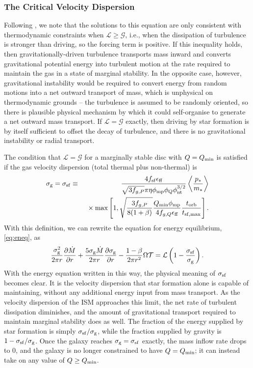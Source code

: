 \documentclass[useAMS,usenatbib]{mn2e}
\newcommand{\calL}{\mathcal{L}}
\newcommand{\calG}{\mathcal{G}}
\newcommand{\calT}{\mathcal{T}}
\newcommand{\phint}{\phi_{\mathrm{nt}}}
\newcommand{\phimp}{\phi_{\mathrm{mp}}}
\newcommand{\Qmin}{Q_{\rm min}}
\begin{document}
\subsubsection{The Critical Velocity Dispersion}

Following \citet{forbes14a}, we note that the solutions to this equation are only consistent with thermodynamic constraints when $\calL \geq \calG$, i.e., when the dissipation of turbulence is stronger than driving, so the forcing term is positive. If this inequality holds, then gravitationally-driven turbulence transports mass inward and converts gravitational potential energy into turbulent motion at the rate required to maintain the gas in a state of marginal stability. In the opposite case, however, gravitational instability would be required to convert energy from random motions into a net outward transport of mass, which is unphysical on thermodynamic grounds -- the turbulence is assumed to be randomly oriented, so there is plausible physical mechanism by which it could self-organise to generate a net outward mass transport. If $\calL = \calG$ exactly, then driving by star formation is by itself sufficient to offset the decay of turbulence, and there is no gravitational instability or radial transport.

The condition that $\calL = \calG$ for a marginally stable disc with $Q = \Qmin$ is satisfied if the gas velocity dispersion (total thermal plus non-thermal) is
\begin{eqnarray}
\label{eq:sigma_sf}
\sigma_{\rm g} = \sigma_{\rm sf} & \equiv &
\frac{4f_{\rm sf} \epsilon_{\rm ff}}{\sqrt{3 f_{g,P}} \pi \eta \phimp \phi_Q \phint^{3/2}}
\left\langle\frac{p_*}{m_*}\right\rangle
\nonumber \\
& & 
\;{} \times
\max\left[1,
\sqrt{\frac{3 f_{g,P}}{8(1+\beta)}} \frac{\Qmin \phimp}{4 f_{g,Q} \epsilon_{\rm ff}}\frac{t_{\rm orb}}{t_{\rm sf,max}}\right].
\end{eqnarray}
With this definition, we can rewrite the equation for energy equilibrium, \autoref{eq:eneq}, as
\begin{equation}
\label{eq:eneq1}
\frac{\sigma_{\rm g}^2}{2\pi r} \frac{\partial \dot{M}}{\partial r} + \frac{5 \sigma_{\rm g} \dot{M}}{2\pi r}  \frac{\partial \sigma_{\rm g}}{\partial r} - \frac{1-\beta}{2\pi r^2} \Omega \calT = \calL \left(1-\frac{\sigma_{\rm sf}}{\sigma_{\rm g}}\right).
\end{equation}
With the energy equation written in this way, the physical meaning of $\sigma_{\rm sf}$ becomes clear. It is the velocity dispersion that star formation alone is capable of maintaining, without any additional energy input from mass transport. As the velocity dispersion of the ISM approaches this limit, the net rate of turbulent dissipation diminishes, and the amount of gravitational transport required to maintain marginal stability does as well. The fraction of the energy supplied by star formation is simply $\sigma_{\rm sf}/\sigma_{\rm g}$, while the fraction supplied by gravity is $1-\sigma_{\rm sf}/\sigma_{\rm g}$. Once the galaxy reaches $\sigma_{\rm g} = \sigma_{\rm sf}$ exactly, the mass inflow rate drops to 0, and the galaxy is no longer constrained to have $Q = \Qmin$; it can instead take on any value of $Q \geq \Qmin$.
\end{document}
